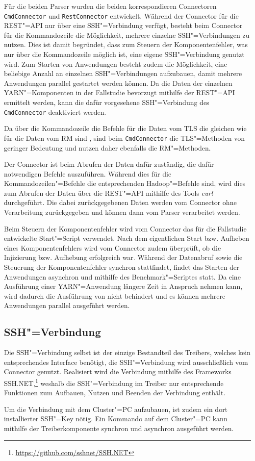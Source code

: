 Für die beiden Parser wurden die beiden korrespondieren Connectoren \texttt{CmdConnector} und \texttt{RestConnector} entwickelt.
Während der Connector für die REST"=API nur über eine SSH"=Verbindung verfügt, besteht beim Connector für die Kommandozeile die Möglichkeit, mehrere einzelne SSH"=Verbindungen zu nutzen.
Dies ist damit begründet, dass zum Steuern der Komponentenfehler, was nur über die Kommandozeile möglich ist, eine eigene SSH"=Verbindung genutzt wird.
Zum Starten von Anwendungen besteht zudem die Möglichkeit, eine beliebige Anzahl an einzelnen SSH"=Verbindungen aufzubauen, damit mehrere Anwendungen parallel gestartet werden können.
Da die Daten der einzelnen YARN"=Komponenten in der Fallstudie bevorzugt mithilfe der REST"=API ermittelt werden, kann die dafür vorgesehene SSH"=Verbindung des \texttt{CmdConnector} deaktiviert werden.

Da über die Kommandozeile die Befehle für die Daten vom \ac{TLS} die gleichen wie für die Daten vom \ac{RM} sind \cite{HadoopYarnTlServer271,HadoopYarnCmds271}, sind beim \texttt{CmdConnector} die \ac{TLS}"=Methoden von geringer Bedeutung und nutzen daher ebenfalls die \ac{RM}"=Methoden.

Der Connector ist beim Abrufen der Daten dafür zuständig, die dafür notwendigen Befehle auszuführen.
Während dies für die Kommandozeilen"=Befehle die entsprechenden Hadoop"=Befehle sind, wird dies zum Abrufen der Daten über die REST"=API mithilfe des Tools \emph{curl} durchgeführt.
Die dabei zurückgegebenen Daten werden vom Connector ohne Verarbeitung zurückgegeben und können dann vom Parser verarbeitet werden.

Beim Steuern der Komponentenfehler wird vom Connector das für die Fallstudie entwickelte Start"=Script verwendet.
Nach dem eigentlichen Start bzw. Aufheben eines Komponentenfehlers wird vom Connector zudem überprüft, ob die Injizierung bzw. Aufhebung erfolgreich war.
Während der Datenabruf sowie die Steuerung der Komponentenfehler synchron stattfindet, findet das Starten der Anwendungen asynchron und mithilfe des Benchmark"=Scriptes statt.
Da eine Ausführung einer YARN"=Anwendung längere Zeit in Anspruch nehmen kann, wird dadurch die Ausführung von \sS nicht behindert und es können mehrere Anwendungen parallel ausgeführt werden.

\subsection{SSH"=Verbindung}\label{sec:sshConnection}

Die SSH"=Verbindung selbst ist der einzige Bestandteil des Treibers, welches kein entsprechendes Interface benötigt, die SSH"=Verbindung wird ausschließlich vom Connector genutzt.
Realisiert wird die Verbindung mithilfe des Frameworks SSH.NET,\footnote{\url{https://github.com/sshnet/SSH.NET}} weshalb die SSH"=Verbindung im Treiber nur entsprechende Funktionen zum Aufbauen, Nutzen und Beenden der Verbindung enthält.

Um die Verbindung mit dem Cluster"=PC aufzubauen, ist zudem ein dort installierter SSH"=Key nötig.
Ein Kommando auf dem Cluster"=PC kann mithilfe der Treiberkomponente synchron und asynchron ausgeführt werden.